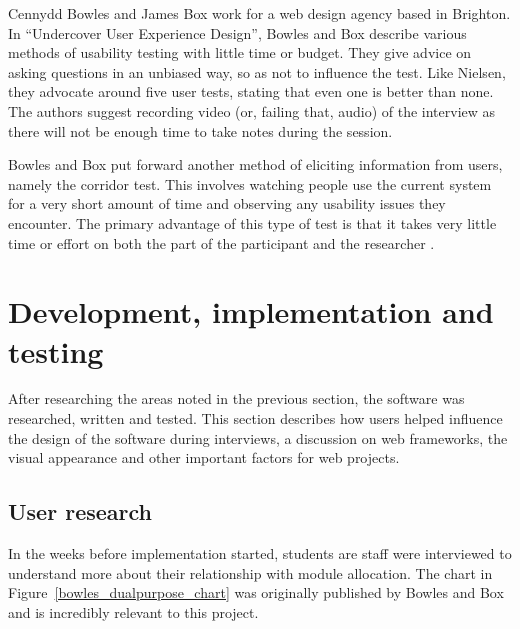 \documentclass[]{scrartcl}
\begin{document}
Cennydd Bowles and James Box work for a web design agency based in Brighton.
In ``Undercover User Experience Design'', Bowles and Box describe various
methods of usability testing with little time or budget. They give advice on
asking questions in an unbiased way, so as not to influence the test. Like
Nielsen, they advocate around five user tests, stating that even one is better
than none. The authors suggest recording video (or, failing that, audio) of
the interview as there will not be enough time to take notes during the
session.

Bowles and Box put forward another method of eliciting information from users,
namely the corridor test. This involves watching people use the current system
for a very short amount of time and observing any usability issues they
encounter. The primary advantage of this type of test is that it takes very
little time or effort on both the part of the participant and the researcher
\cite{bowles2011undercover}.

\section{Development, implementation and testing}


After researching the areas noted in the previous section, the software was
researched, written and tested. This section describes how users helped
influence the design of the software during interviews, a discussion on web
frameworks, the visual appearance and other important factors for web
projects.

\subsection{User research}

In the weeks before implementation started, students are staff were
interviewed to understand more about their relationship with module
allocation. The chart in Figure~\ref{bowles_dualpurpose_chart} was originally
published by Bowles and Box and is incredibly relevant to this project.
\end{document}

